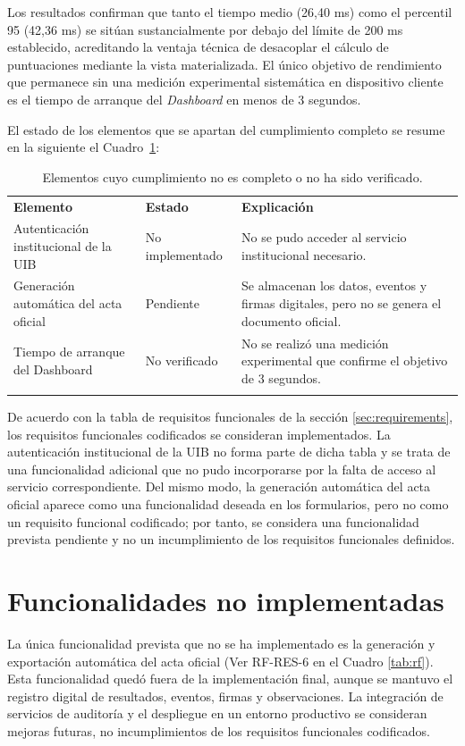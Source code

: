 Los resultados confirman que tanto el tiempo medio (26,40 ms) como el percentil 95 (42,36 ms) se sitúan sustancialmente por debajo del límite de 200 ms establecido, acreditando la ventaja técnica de desacoplar el cálculo de puntuaciones mediante la vista materializada. El único objetivo de rendimiento que permanece sin una medición experimental sistemática en dispositivo cliente es el tiempo de arranque del \emph{Dashboard} en menos de 3 segundos.

El estado de los elementos que se apartan del cumplimiento completo se resume en la siguiente el Cuadro~\ref{tab:affected_requirements}:

\begin{table}[H]
	\centering
	\renewcommand{\arraystretch}{1.25}
	\begin{tabularx}{\textwidth}{>{\RaggedRight\arraybackslash}p{2.6cm} p{2.1cm} >{\RaggedRight\arraybackslash}X}
			\textbf{Elemento} & \textbf{Estado} & \textbf{Explicación} \\ \lightrule
		Autenticación institucional de la UIB & No implementado & No se pudo acceder al servicio institucional necesario. \\ \lightrule
		Generación automática del acta oficial & Pendiente & Se almacenan los datos, eventos y firmas digitales, pero no se genera el documento oficial. \\ \lightrule
		Tiempo de arranque del Dashboard & No verificado & No se realizó una medición experimental que confirme el objetivo de 3 segundos. \\ \lightrule
	\end{tabularx}
	\caption{Elementos cuyo cumplimiento no es completo o no ha sido verificado.}
	\label{tab:affected_requirements}
\end{table}

De acuerdo con la tabla de requisitos funcionales de la sección \ref{sec:requirements}, los requisitos funcionales codificados se consideran implementados. La autenticación institucional de la UIB no forma parte de dicha tabla y se trata de una funcionalidad adicional que no pudo incorporarse por la falta de acceso al servicio correspondiente. Del mismo modo, la generación automática del acta oficial aparece como una funcionalidad deseada en los formularios, pero no como un requisito funcional codificado; por tanto, se considera una funcionalidad prevista pendiente y no un incumplimiento de los requisitos funcionales definidos.

\section{Funcionalidades no implementadas}
La única funcionalidad prevista que no se ha implementado es la generación y exportación automática del acta oficial (Ver RF-RES-6 en el Cuadro \ref{tab:rf}). Esta funcionalidad quedó fuera de la implementación final, aunque se mantuvo el registro digital de resultados, eventos, firmas y observaciones. La integración de servicios de auditoría y el despliegue en un entorno productivo se consideran mejoras futuras, no incumplimientos de los requisitos funcionales codificados.

